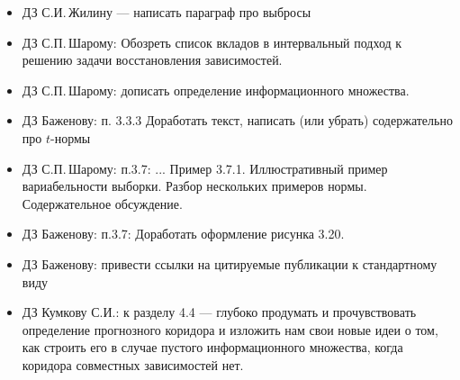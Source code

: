 \documentclass[a5paper,openany]{book}
\begin{document}
\raggedright\small\printindex 
  
\pagebreak
  
\begin{itemize}
  
\item ДЗ С.И.\,Жилину --- написать параграф про выбросы  
      
\item ДЗ С.П.\,Шарому: Обозреть список вкладов в интервальный подход к решению 
задачи восстановления зависимостей.
    
\item ДЗ С.П.\,Шарому: дописать определение информационного множества. 
  
\item ДЗ Баженову: п. 3.3.3 Доработать текст, написать (или убрать) 
      содержательно про $t$-нормы 
  
\item ДЗ С.П.\,Шарому: п.3.7:  ... Пример 3.7.1. Иллюстративный пример вариабельности 
выборки. Разбор нескольких примеров нормы. Содержательное обсуждение. 
  
\item ДЗ Баженову: п.3.7: Доработать оформление рисунка 3.20. 

\item ДЗ Баженову: привести ссылки на цитируемые публикации к стандартному виду
   
\item ДЗ Кумкову С.И.: к разделу 4.4 --- глубоко продумать и прочувствовать
      определение прогнозного коридора и изложить нам свои новые идеи о том, 
      как строить его в случае пустого информационного множества, 
      когда коридора совместных зависимостей нет. 
  
\end{itemize}
  
  
\end{document}
